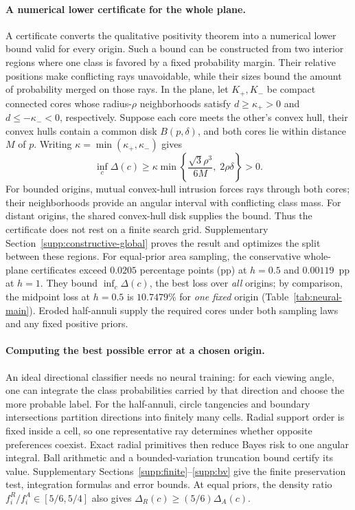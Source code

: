 \paragraph{A numerical lower certificate for the whole plane.}
A certificate converts the qualitative positivity theorem into a numerical lower bound valid for every origin. Such a bound can be constructed from two interior regions where one class is favored by a fixed probability margin. Their relative positions make conflicting rays unavoidable, while their sizes bound the amount of probability merged on those rays. In the plane, let $K_+,K_-$ be compact connected cores whose radius-$\rho$ neighborhoods satisfy $d\geq\kappa_+>0$ and $d\leq-\kappa_-<0$, respectively. Suppose each core meets the other's convex hull, their convex hulls contain a common disk $B(p,\delta)$, and both cores lie within distance $M$ of $p$. Writing $\kappa=\min(\kappa_+,\kappa_-)$ gives
\begin{equation}
 \inf_c\Delta(c)\geq\kappa\min\left\{
 \frac{\sqrt3\rho^3}{6M},\;2\rho\delta\right\}>0.
 \label{eq:constructive-global}
\end{equation}
For bounded origins, mutual convex-hull intrusion forces rays through both cores; their neighborhoods provide an angular interval with conflicting class mass. For distant origins, the shared convex-hull disk supplies the bound. Thus the certificate does not rest on a finite search grid. Supplementary Section~\ref{supp:constructive-global} proves the result and optimizes the split between these regions. For equal-prior area sampling, the conservative whole-plane certificates exceed $0.0205$ percentage points (pp) at $h=0.5$ and $0.00119$~pp at $h=1$. They bound $\inf_c\Delta(c)$, the best loss over \emph{all} origins; by comparison, the midpoint loss at $h=0.5$ is $10.7479\%$ for \emph{one fixed} origin (Table~\ref{tab:neural-main}). Eroded half-annuli supply the required cores under both sampling laws and any fixed positive priors.

\paragraph{Computing the best possible error at a chosen origin.}
An ideal directional classifier needs no neural training: for each viewing angle, one can integrate the class probabilities carried by that direction and choose the more probable label. For the half-annuli, circle tangencies and boundary intersections partition directions into finitely many cells. Radial support order is fixed inside a cell, so one representative ray determines whether opposite preferences coexist. Exact radial primitives then reduce Bayes risk to one angular integral. Ball arithmetic and a bounded-variation truncation bound certify its value. Supplementary Sections~\ref{supp:finite}--\ref{supp:bv} give the finite preservation test, integration formulas and error bounds. At equal priors, the density ratio $f_i^R/f_i^A\in[5/6,5/4]$ also gives $\Delta_R(c)\geq(5/6)\Delta_A(c)$.

